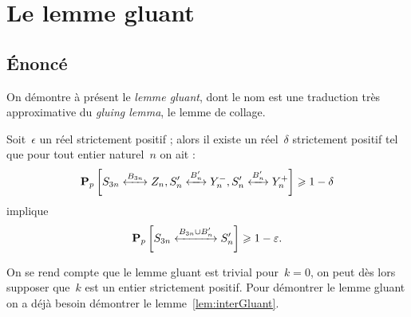\section{Le lemme gluant}
	\subsection{Énoncé}
		On démontre à présent le \emph{lemme gluant}, dont le nom est une traduction très approximative du \emph{gluing lemma}, le lemme de collage.
			
		\begin{lem}\label{lem:gluant}
			Soit~$\epsilon$ un réel strictement positif ; alors il existe un réel~$\delta$ strictement positif tel que pour tout entier naturel~$n$ on ait :
			\[
				\Pp{\relie[B_{3n}]{S_{3n}}{Z_n},
					\relie[B_n']{S_n'}{Y_n^-},
					\relie[B_n']{S_n'}{Y_n^+}}
				\geq 1 - \delta
			\]
			implique
			\[
				\Pp{\relie[B_{3n}\cup B_n']{S_{3n}}{S_n'}}
				\geq 1 - \epsilon.
			\]
		\end{lem}
		\begin{figure}[h]
		\begin{center}
		\begin{quartCarre}
		\end{quartCarre}
		\end{center}
		\end{figure}
		On se rend compte que le lemme gluant est trivial pour~$k=0$, on peut dès lors supposer que~$k$ est un entier strictement positif. Pour démontrer le lemme gluant on a déjà besoin démontrer le lemme~\ref{lem:interGluant}.
	
